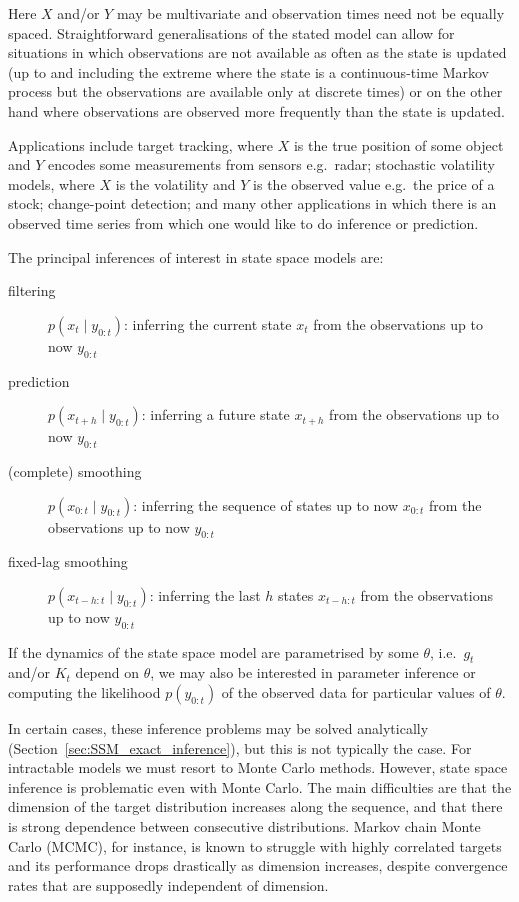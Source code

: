Here $X$ and/or $Y$ may be multivariate and observation times need not be equally spaced. Straightforward generalisations of the stated model can allow for situations in which observations are not available as often as the state is updated (up to and including the extreme where the state is a continuous-time Markov process but the observations are available only at discrete times) or on the other hand where observations are observed more frequently than the state is updated.

Applications include target tracking, where $X$ is the true position of some object and $Y$ encodes some measurements from sensors e.g.\ radar; stochastic volatility models, where $X$ is the volatility and $Y$ is the observed value e.g.\ the price of a stock; change-point detection; and many other applications in which there is an observed time series from which one would like to do inference or prediction.

The principal inferences of interest in state space models are:
\begin{description}
\item [filtering] $p(x_t\mid y_{0:t})$: inferring the current state $x_t$ from the observations up to now $y_{0:t}$
\item [prediction] $p(x_{t+h}\mid y_{0:t})$: inferring a future state $x_{t+h}$ from the observations up to now $y_{0:t}$
\item [(complete) smoothing] $p(x_{0:t}\mid y_{0:t})$: inferring the sequence of states up to now $x_{0:t}$ from the observations up to now $y_{0:t}$
\item [fixed-lag smoothing] $p(x_{t-h:t}\mid y_{0:t})$: inferring the last $h$ states $x_{t-h:t}$ from the observations up to now $y_{0:t}$
\end{description}
If the dynamics of the state space model are parametrised by some $\theta$, i.e.\ $g_t$ and/or $K_t$ depend on $\theta$, we may also be interested in parameter inference or computing the likelihood $p(y_{0:t})$ of the observed data for particular values of $\theta$.

In certain cases, these inference problems may be solved analytically (Section~\ref{sec:SSM_exact_inference}), but this is not typically the case. For intractable models we must resort to Monte Carlo methods. However, state space inference is problematic even with Monte Carlo. 
The main difficulties are that the dimension of the target distribution increases along the sequence, and that there is strong dependence between consecutive distributions. Markov chain Monte Carlo (MCMC), for instance, is known to struggle with highly correlated targets\seb{[citation]} and its performance drops drastically as dimension increases, despite convergence rates that are supposedly independent of dimension\seb{[citation]}.

